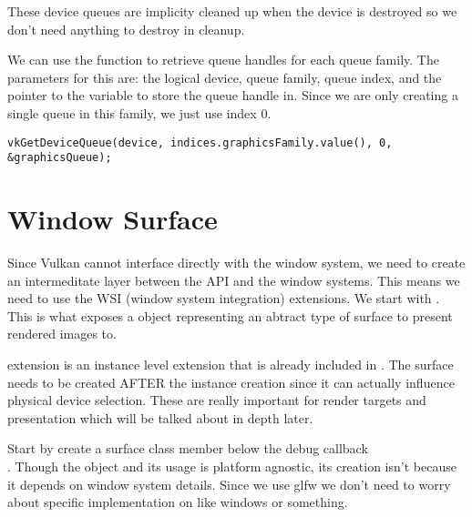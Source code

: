 \par These device queues are implicity cleaned up when the device is destroyed so we don't need anything to destroy in cleanup.

\par We can use the  function to retrieve queue handles for each queue family. The parameters for this are: the logical device, queue family, queue index, and the pointer to the variable to store the queue handle in. Since we are only creating a single queue in this family, we just use index $0$.

\begin{center}
\begin{minipage}{0.95\linewidth}
\begin{lstlisting}
vkGetDeviceQueue(device, indices.graphicsFamily.value(), 0, &graphicsQueue);
\end{lstlisting}
\end{minipage}
\end{center}

\section*{Window Surface}

\par Since Vulkan cannot interface directly with the window system, we need to create an intermeditate layer between the API and the window systems. This means we need to use the WSI (window system integration) extensions. We start with  . This is what exposes a  object representing an abtract type of surface to present rendered images to.

\par {} extension is an instance level extension that is already included in . The surface needs to be created AFTER the instance creation since it can actually influence physical device selection. These are really important for render targets and presentation which will be talked about in depth later.

\par Start by create a surface class member below the debug callback \\ 
. Though the object and its usage is platform agnostic, its creation isn't because it depends on window system details. Since we use glfw we don't need to worry about specific implementation on like windows or something.

